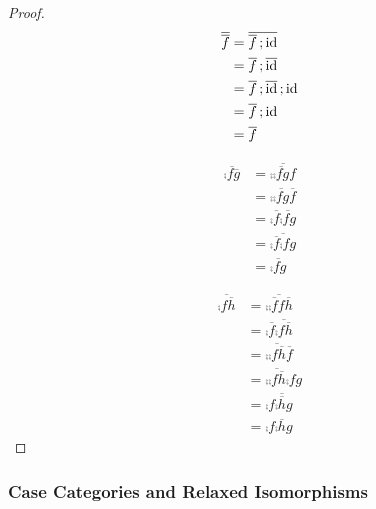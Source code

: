 \documentclass[runningheads,envcountsame]{llncs}
\begin{document}
\begin{proof}
    \begin{align}
        \overline{\overline{f}} & = \overline{\comp{\overline{f}}{\id}} \\
            & = \comp{\overline{f}}{\overline{\id}} \\
            & = \comp{\overline{f}}{\comp{\overline{\id}}{\id}} \\
            & = \comp{\overline{f}}{\id} \\
            & = \overline{f} \\
    \end{align}
    
    \begin{align}
        \overline{\comp{f}{\overline{g}}} &= \overline{\comp{\overline{\comp{f}{g}}}{f}} \\
            &= \comp{\overline{\comp{f}{g}}}{\overline{f}} \\ 
            &= \comp{\overline{f}}{\overline{\comp{f}{g}}} \\ 
            &= \overline{\comp{\overline{f}}{\comp{f}{g}}} \\ 
            &= \overline{\comp{f}{g}}
    \end{align}
    
    \begin{align}
        \overline{\comp{f}{\overline{h}}} & = \overline{\comp{\comp{\overline{f}}{f}}{\overline{h}}} \\
            & = \comp{\overline{f}}{\overline{\comp{f}{\overline{h}}}} \\
            & = \comp{\overline{\comp{f}{\overline{h}}}}{\overline{f}} \\
            & = \comp{\overline{\comp{f}{\overline{h}}}}{\comp{f}{g}} \\
            & = \comp{f}{\comp{\overline{\overline{h}}}{g}} \\
            & = \comp{f}{\comp{\overline{h}}{g}} 
    \end{align}
\end{proof}

\subsubsection{Case Categories and Relaxed Isomorphisms}
\end{document}
